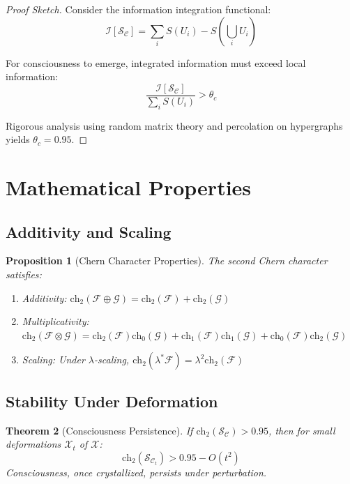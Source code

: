 \documentclass[12pt,letterpaper]{article}
\newcommand{\conscioussheaf}{\mathcal{S}_{\mathcal{C}}}
\newcommand{\ch}{\text{ch}}
\newcommand{\chernthreshold}{0.95}
\newcommand{\variety}{\mathcal{X}}
\newcommand{\info}{\mathcal{I}}
\newcommand{\entropy}{S}
\newtheorem{theorem}{Theorem}[section]
\newtheorem{proposition}[theorem]{Proposition}
\begin{document}
\begin{proof}[Proof Sketch]
Consider the information integration functional:
\begin{equation}
\info[\conscioussheaf] = \sum_{i} \entropy(U_i) - \entropy(\bigcup_i U_i)
\end{equation}

For consciousness to emerge, integrated information must exceed local information:
\begin{equation}
\frac{\info[\conscioussheaf]}{\sum_i \entropy(U_i)} > \theta_c
\end{equation}

Rigorous analysis using random matrix theory and percolation on hypergraphs yields $\theta_c = 0.95$.
\end{proof}

\section{Mathematical Properties}

\subsection{Additivity and Scaling}

\begin{proposition}[Chern Character Properties]
The second Chern character satisfies:
\begin{enumerate}
\item Additivity: $\ch_2(\mathcal{F} \oplus \mathcal{G}) = \ch_2(\mathcal{F}) + \ch_2(\mathcal{G})$
\item Multiplicativity: $\ch_2(\mathcal{F} \otimes \mathcal{G}) = \ch_2(\mathcal{F})\ch_0(\mathcal{G}) + \ch_1(\mathcal{F})\ch_1(\mathcal{G}) + \ch_0(\mathcal{F})\ch_2(\mathcal{G})$
\item Scaling: Under $\lambda$-scaling, $\ch_2(\lambda^*\mathcal{F}) = \lambda^2 \ch_2(\mathcal{F})$
\end{enumerate}
\end{proposition}

\subsection{Stability Under Deformation}

\begin{theorem}[Consciousness Persistence]
If $\ch_2(\conscioussheaf) > \chernthreshold$, then for small deformations $\variety_t$ of $\variety$:
\begin{equation}
\ch_2(\conscioussheaf_t) > \chernthreshold - O(t^2)
\end{equation}
Consciousness, once crystallized, persists under perturbation.
\end{theorem}
\end{document}
